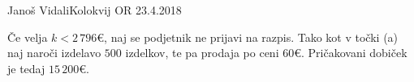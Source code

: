 \begin{naloga}{Janoš Vidali}{Kolokvij OR 23.4.2018}
\begin{odgovor}
\begin{enumerate}[(a)]
Če velja $k < 2\,796 €$, naj se podjetnik ne prijavi na razpis.
Tako kot v točki (a) naj naroči izdelavo $500$ izdelkov,
te pa prodaja po ceni $60 €$.
Pričakovani dobiček je tedaj $15\,200 €$.
\end{enumerate}

\begin{slika}
\pgfslika[podjetnik-a]
\end{slika}

\begin{slika}
\makebox[\textwidth][c]{
\pgfslika[podjetnik-b]
}
\end{slika}
\end{odgovor}
\end{naloga}
